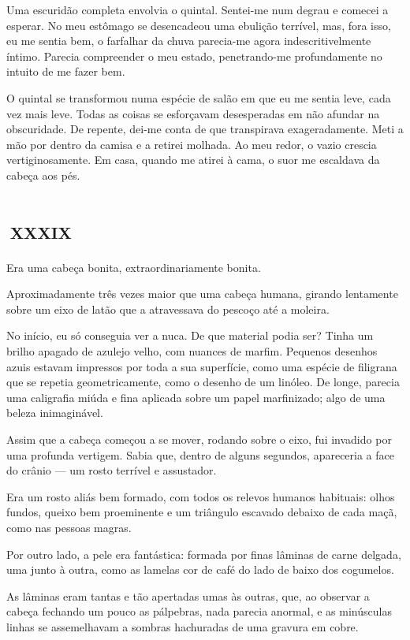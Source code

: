 Uma escuridão completa envolvia o quintal. Sentei-me num degrau e comecei a esperar. No meu estômago se desencadeou uma ebulição terrível, mas, fora isso, eu me sentia bem, o farfalhar da chuva parecia-me agora indescritivelmente íntimo. Parecia compreender o meu estado, penetrando-me profundamente no intuito de me fazer bem.

O quintal se transformou numa espécie de salão em que eu me sentia leve, cada vez mais leve. Todas as coisas se esforçavam desesperadas em não afundar na obscuridade. De repente, dei-me conta de que transpirava exageradamente. Meti a mão por dentro da camisa e a retirei molhada. Ao meu redor, o vazio crescia vertiginosamente. Em casa, quando me atirei à cama, o suor me escaldava da cabeça aos pés.


\chapter*{\small{}\,\Large\centering\textsc{xxxix}\,\small{}}

Era uma cabeça bonita, extraordinariamente bonita.

Aproximadamente três vezes maior que uma cabeça humana, girando lentamente sobre um eixo de latão que a atravessava do pescoço até a moleira. 

No início, eu só conseguia ver a nuca. De que material podia ser? Tinha um brilho apagado de azulejo velho, com nuances de marfim. Pequenos desenhos azuis estavam impressos por toda a sua superfície, como uma espécie de filigrana que se repetia geometricamente, como o desenho de um linóleo. De longe, parecia uma caligrafia miúda e fina aplicada sobre um papel marfinizado; algo de uma beleza inimaginável.

Assim que a cabeça começou a se mover, rodando sobre o eixo, fui invadido por uma profunda vertigem. Sabia que, dentro de alguns segundos, apareceria a face do crânio --- um rosto terrível e assustador.

Era um rosto aliás bem formado, com todos os relevos humanos habituais: olhos fundos, queixo bem proeminente e um triângulo escavado debaixo de cada maçã, como nas pessoas magras.

Por outro lado, a pele era fantástica: formada por finas lâminas de carne delgada, uma junto à outra, como as lamelas cor de café do lado de baixo dos cogumelos.

As lâminas eram tantas e tão apertadas umas às outras, que, ao observar a cabeça fechando um pouco as pálpebras, nada parecia anormal, e as minúsculas linhas se assemelhavam a sombras hachuradas de uma gravura em cobre.

